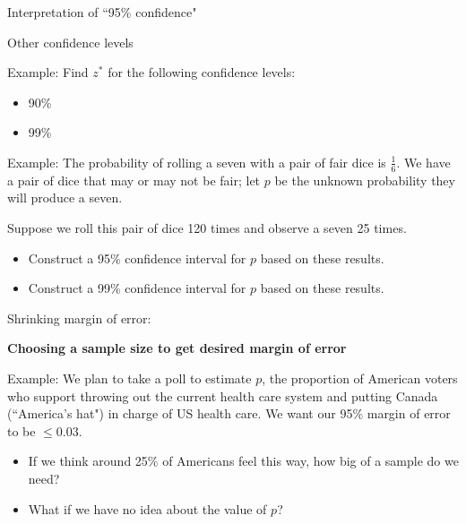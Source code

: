 \documentclass[11pt,letterpaper,twoside]{article}
\begin{document}
Interpretation of ``95\% confidence" \vspace{120pt}

Other confidence levels

\newpage

Example: Find $z^*$ for the following confidence levels:

\begin{itemize}

\item 90\% \vspace{50pt}

\item 99\% \vspace{50pt}

\end{itemize}

Example:  The probability of rolling a seven with a pair of fair dice is $\frac{1}{6}$.  We have a pair of dice that may or may not be fair; let $p$ be the unknown probability they will produce a seven.

Suppose we roll this pair of dice 120 times and observe a seven 25 times. 

\begin{itemize}

\item Construct a 95\% confidence interval for $p$ based on these results. \vspace{80pt}

\item Construct a 99\% confidence interval for $p$ based on these results. \vspace{50pt}

\end{itemize}

Shrinking margin of error: 

\newpage

{\bf Choosing a sample size to get desired margin of error} \vspace{6pt}

Example: We plan to take a poll to estimate $p$, the proportion of American voters who support throwing out the current health care system and putting Canada (``America's hat") in charge of US health care.  We want our 95\% margin of error to be $\leq 0.03$.  

\begin{itemize}

\item If we think around 25\% of Americans feel this way, how big of a sample do we need?  \vspace{100pt}

\item What if we have no idea about the value of $p$?

\end{itemize}






\label{totalpag}
\end{document}
